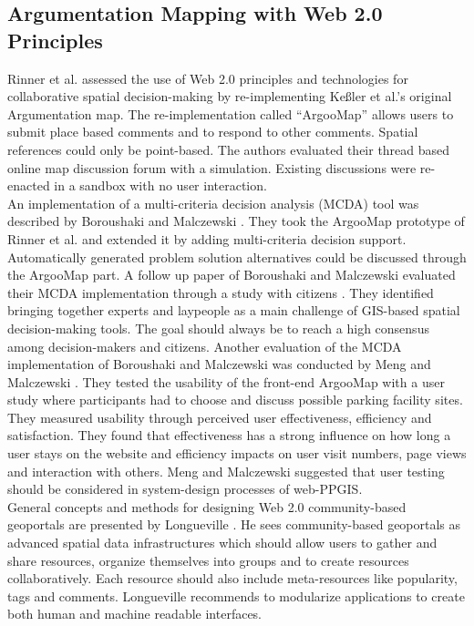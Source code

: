 \subsection{Argumentation Mapping with Web 2.0 Principles}
\label{zweifuenf}
Rinner \cite{Rinner2009_Web2_argumap} et al. assessed the use of Web 2.0 principles and technologies for collaborative spatial decision-making by re-implementing Ke{\ss}ler et al.'s \cite{Kessler2005_ArgumentationMapPrototype} original Argumentation map. The re-implementation called ``ArgooMap'' allows users to submit place based comments and to respond to other comments. Spatial references could only be point-based. The authors evaluated their thread based online map discussion forum with a simulation. Existing discussions were re-enacted in a sandbox with no user interaction.\\
An implementation of a multi-criteria decision analysis (MCDA) tool was described by Boroushaki and Malczewski \cite{Boroushaki2010_ParticipatoryGIS}. They took the ArgooMap prototype of Rinner et al. \cite{Rinner2009_Web2_argumap} and extended it by adding multi-criteria decision support. Automatically generated problem solution alternatives could be discussed through the ArgooMap part. A follow up paper of Boroushaki and Malczewski evaluated their MCDA implementation through a study with citizens \cite{Boroushaki2010_Consensus_measurement}. They identified bringing together experts and laypeople as a main challenge of GIS-based spatial decision-making tools.  The goal should always be to reach a high consensus among decision-makers and citizens. Another evaluation of the MCDA implementation of Boroushaki and Malczewski was conducted by Meng and Malczewski \cite{Meng2010_ArgooMap_evaluation}. They tested the usability of the front-end ArgooMap with a user study where participants had to choose and discuss possible parking facility sites. They measured usability through perceived user effectiveness, efficiency and satisfaction. They found that effectiveness has a strong influence on how long a user stays on the website and efficiency impacts on user visit numbers, page views and interaction with others. Meng and Malczewski suggested that user testing should be considered in system-design processes of web-PPGIS. \\
General concepts and methods for designing Web 2.0 community-based geoportals are presented by Longueville \cite{Longueville2010_community_based_geoportals_web20}. He sees community-based geoportals as advanced spatial data infrastructures which should allow users to gather and share resources, organize themselves into groups and to create resources collaboratively. Each resource should also include meta-resources like popularity, tags and comments. Longueville recommends to modularize applications to create both human and machine readable interfaces.\\
